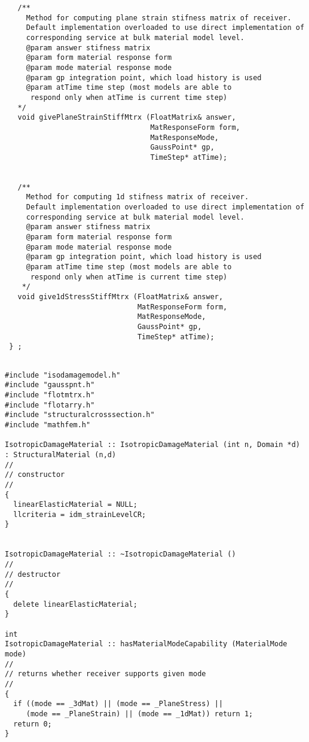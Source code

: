 \documentclass[12pt,draft]{article}
\begin{document}
{\begin{verbatim}
   /**
     Method for computing plane strain stifness matrix of receiver.
     Default implementation overloaded to use direct implementation of 
     corresponding service at bulk material model level.
     @param answer stifness matrix
     @param form material response form
     @param mode material response mode
     @param gp integration point, which load history is used
     @param atTime time step (most models are able to 
      respond only when atTime is current time step)
   */
   void givePlaneStrainStiffMtrx (FloatMatrix& answer, 
                                  MatResponseForm form,
                                  MatResponseMode,
                                  GaussPoint* gp, 
                                  TimeStep* atTime);


   /**
     Method for computing 1d stifness matrix of receiver.
     Default implementation overloaded to use direct implementation of 
     corresponding service at bulk material model level.
     @param answer stifness matrix
     @param form material response form
     @param mode material response mode
     @param gp integration point, which load history is used
     @param atTime time step (most models are able to 
      respond only when atTime is current time step)
    */
   void give1dStressStiffMtrx (FloatMatrix& answer, 
                               MatResponseForm form,
                               MatResponseMode,
                               GaussPoint* gp,
                               TimeStep* atTime);
 } ;

 \end{verbatim}
 }

{\small
\begin{verbatim}

#include "isodamagemodel.h"
#include "gausspnt.h"
#include "flotmtrx.h"
#include "flotarry.h"
#include "structuralcrosssection.h"
#include "mathfem.h"

IsotropicDamageMaterial :: IsotropicDamageMaterial (int n, Domain *d)
: StructuralMaterial (n,d)
//
// constructor
//
{
  linearElasticMaterial = NULL;
  llcriteria = idm_strainLevelCR;
}


IsotropicDamageMaterial :: ~IsotropicDamageMaterial ()
//
// destructor
//
{
  delete linearElasticMaterial;
}

int
IsotropicDamageMaterial :: hasMaterialModeCapability (MaterialMode mode)
//
// returns whether receiver supports given mode
//
{
  if ((mode == _3dMat) || (mode == _PlaneStress) || 
     (mode == _PlaneStrain) || (mode == _1dMat)) return 1;
  return 0;
}
\end{verbatim}}
\end{document}
